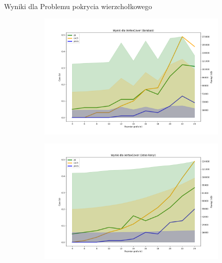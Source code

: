 \begin{frame}{Wyniki dla Problemu pokrycia wierzchołkowego}
	\begin{figure}[htbp]
		\centering
		\begin{subfigure}[b]{0.5\textwidth}
			\includegraphics[width=\textwidth]{../thesis/figures/5-barabasi-plot.png}
		\end{subfigure}
		\begin{subfigure}[b]{0.49\textwidth}
			\includegraphics[width=\textwidth]{../thesis/figures/5-erdos-renyi-plot.png}
		\end{subfigure}
	\end{figure}
\end{frame}
	